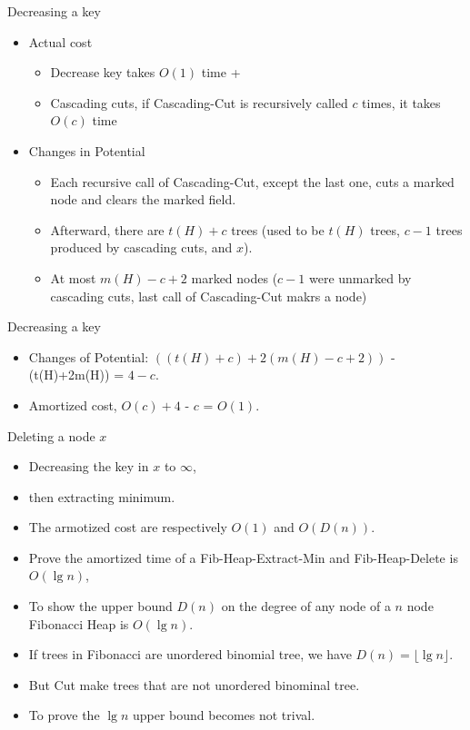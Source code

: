 \documentclass{beamer}
\begin{document}
\begin{frame}{}
\centerline{\large Decreasing a key}
\begin{itemize}
\item Actual cost
\begin{itemize}
\item Decrease key takes $O(1)$ time +
\item Cascading cuts, if {\sc Cascading-Cut} is recursively called $c$ times, it takes $O(c)$ time
\end{itemize}
\item Changes in Potential
\begin{itemize}
\item Each recursive call of {\sc Cascading-Cut}, except the last one, cuts a marked node and clears the marked field. 
\item Afterward, there are $t(H)+c$ trees (used to be $t(H)$ trees, $c-1$ trees produced by cascading cuts,
 and $x$). 
\item At most $m(H)-c+2$ marked nodes ($c-1$ were unmarked by cascading cuts, last call of {\sc Cascading-Cut}
makrs a node)
\end{itemize}
\end{itemize}
\end{frame}

\begin{frame}{}
\centerline{\large Decreasing a key}
\vspace{0.5cm}
\begin{itemize}
\item Changes of Potential: $((t(H)+c)+2(m(H)-c+2))$ - (t(H)+2m(H)) = $4-c$.
\item Amortized cost, $O(c)+4$ - $c$ = $O(1)$. 
\end{itemize}
\end{frame}

\begin{frame}{}
{\centerline{\large Deleting a node $x$}}
\begin{itemize}
\item Decreasing the key in $x$ to $\infty$,
\item then extracting minimum.
\item The armotized cost are respectively $O(1)$ and $O(D(n))$.
\end{itemize}
\end{frame}

\begin{frame}{}
\begin{itemize}
\item Prove the amortized time of a {\sc Fib-Heap-Extract-Min} and {\sc Fib-Heap-Delete} is $O(\lg n)$,
\item To show the upper bound $D(n)$ on the degree of any node of a $n$ node Fibonacci Heap is $O(\lg n)$. 
\item If trees in Fibonacci are unordered binomial tree, we have $D(n)=\lfloor \lg n\rfloor$.
\item But {\sc Cut} make trees that are not unordered binominal tree. 
\item To prove the $\lg n$ upper bound becomes not trival. 
\end{itemize}
\end{frame}
\end{document}

